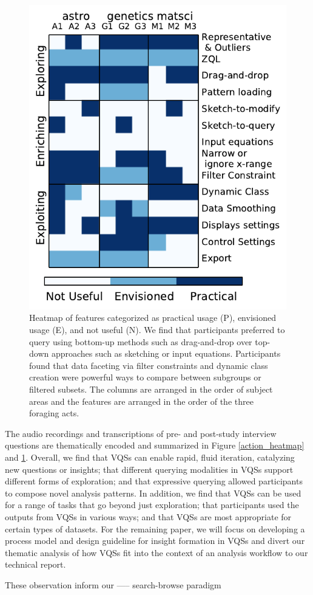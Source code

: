 \begin{figure}[ht!]
    \centering
    \includegraphics[width=0.7\columnwidth]{figures/result2.pdf}
    \vspace{-6pt}\caption{Heatmap of features categorized as practical usage (P), envisioned usage (E), and not useful (N). We find that participants preferred to query using bottom-up methods such as drag-and-drop over top-down approaches such as sketching or input equations. Participants found that data faceting via filter constraints and dynamic class creation were powerful ways to compare between subgroups or filtered subsets. The columns are arranged in the order of subject areas and the features are arranged in the order of the three foraging acts.}
    \label{feature_heatmap}
    \vspace{-5pt}
\end{figure}

\par The audio recordings and transcriptions of pre- and post-study interview questions are thematically encoded and summarized in Figure \ref{action_heatmap} and \ref{feature_heatmap}. Overall, we find that VQSs can enable rapid, fluid iteration, catalyzing new questions or insights; that different querying modalities in VQSs support different forms of exploration; and that expressive querying allowed participants to compose novel analysis patterns. In addition, we find that VQSs can be used for a range of tasks that go beyond just exploration; that participants used the outputs from VQSs in various ways; and that VQSs are most appropriate for certain types of datasets.
For the remaining paper, we will focus on developing a process model and design guideline for insight formation in VQSs and divert our thematic analysis of how VQSs fit into the context of an analysis workflow to our technical report.

These observation inform our ----- search-browse paradigm
